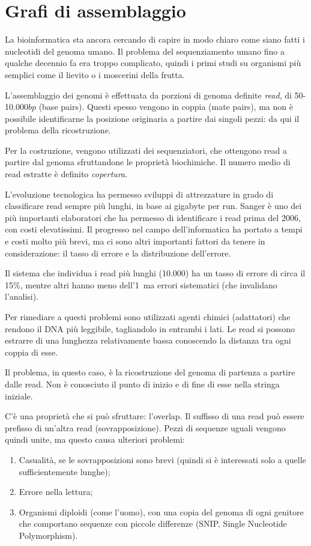 \section{Grafi di assemblaggio}
La bioinformatica sta ancora cercando di capire in modo chiaro come siano fatti i nucleotidi del genoma umano. Il problema del sequenziamento umano fino a qualche decennio fa era troppo complicato, quindi i primi studi su organismi più semplici come il lievito o i moscerini della frutta.

L'assemblaggio dei genomi è effettuata da porzioni di genoma definite \textit{read}, di 50-10.000$bp$ (base pairs). Questi spesso vengono in coppia (mate pairs), ma non è possibile identificarne la posizione originaria a partire dai singoli pezzi: da qui il problema della ricostruzione.

Per la costruzione, vengono utilizzati dei sequenziatori, che ottengono read a partire dal genoma sfruttandone le proprietà biochimiche. Il numero medio di read estratte è definito \textit{copertura}.

L'evoluzione tecnologica ha permesso sviluppi di attrezzature in grado di classificare read sempre più lunghi, in base ai gigabyte per run. Sanger è uno dei più importanti elaboratori che ha permesso di identificare i read prima del 2006, con costi elevatissimi. Il progresso nel campo dell'informatica ha portato a tempi e costi molto più brevi, ma ci sono altri importanti fattori da tenere in considerazione: il tasso di errore e la distribuzione dell'errore.

Il sistema che individua i read più lunghi (10.000) ha un tasso di errore di circa il 15\%, mentre altri hanno meno dell'1\textperthousand\ ma errori sistematici (che invalidano l'analisi). 

Per rimediare a questi problemi sono utilizzati agenti chimici (adattatori) che rendono il DNA più leggibile, tagliandolo in entrambi i lati. Le read si possono estrarre di una lunghezza relativamente bassa conoscendo la distanza tra ogni coppia di esse.

Il problema, in questo caso, è la ricostruzione del genoma di partenza a partire dalle read. Non è conosciuto il punto di inizio e di fine di esse nella stringa iniziale. 

C'è una proprietà che si può sfruttare: l'overlap. Il suffisso di una read può essere prefisso di un'altra read (sovrapposizione). Pezzi di sequenze uguali vengono quindi unite, ma questo causa ulteriori problemi:
\begin{enumerate}
	\item Casualità, se le sovrapposizioni sono brevi (quindi si è interessati solo a quelle sufficientemente lunghe);
	\item Errore nella lettura;
	\item Organismi diploidi (come l'uomo), con una copia del genoma di ogni genitore che comportano sequenze con piccole differenze (SNIP, Single Nucleotide Polymorphism).
\end{enumerate}

